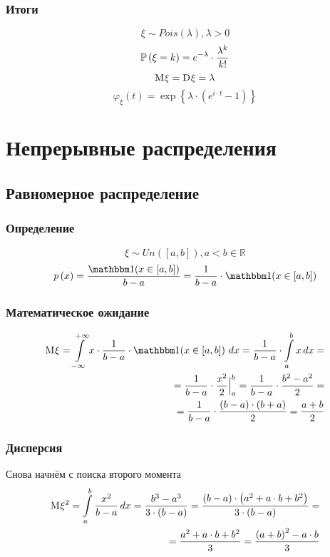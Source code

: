 \subsubsection{Итоги}
$$\xi \sim Pois\left( \lambda \right), \lambda > 0$$
$$\probability{\xi=k} = e^{-\lambda} \cdot \frac{\lambda^k}{k!}$$
$$\mean{\xi}=\dispersion{\xi}=\lambda$$
$$\varphi_{\xi}\left( t \right)
    = \exp{\left\{ \lambda \cdot \left( e^{i \cdot t} - 1 \right) \right\}}$$

\section{Непрерывные распределения}

\subsection{Равномерное распределение}
\subsubsection{Определение}
$$\xi \sim Un\left( \left[ a,b \right] \right), a<b \in \mathbb{R}$$
$$\pdf{x}
    = \frac{\indicator{x \in [a,b]}}{b-a}
    = \frac{1}{b-a} \cdot \indicator{x \in [a,b]}$$
\subsubsection{Математическое ожидание}
\begin{align*}
    \mean{\xi}
        = \integral{-\infty}{+\infty}{x}{
            x \cdot \frac{1}{b-a} \cdot \indicator{x \in [a,b]}}
        = \frac{1}{b-a} \cdot \integral{a}{b}{x}{x} = \\
        = \frac{1}{b-a} \cdot \Bigl. \frac{x^2}{2} \Bigr|_a^b
        = \frac{1}{b-a} \cdot \frac{b^2 - a^2}{2} = \\
        = \frac{1}{b-a} \cdot
            \frac{\left( b - a \right) \cdot \left( b + a \right)}{2}
        = \frac{a+b}{2}
\end{align*}
\subsubsection{Дисперсия}
Снова начнём с поиска второго момента
\begin{align*}
    \mean{\xi^2}
        = \integral{a}{b}{x}{\frac{x^2}{b - a}}
        = \frac{b^3 - a^3}{3 \cdot \left( b - a \right)}
        = \frac{\left( b-a \right) \cdot \left( a^2 + a \cdot b + b^2 \right)}
            {3 \cdot \left( b-a \right)} = \\
        = \frac{a^2 + a \cdot b + b^2}{3}
        = \frac{\left( a + b \right)^2 - a \cdot b}{3}
\end{align*}

